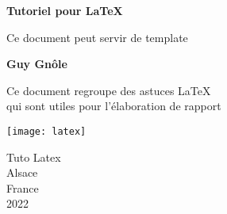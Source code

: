 \documentclass[../main.tex]{subfiles}
\begin{document}
\thispagestyle{empty}

\begin{center}
    \vspace*{2cm}
            
    \Huge
    \textbf{Tutoriel pour \LaTeX}
            
    \vspace{0.5cm}
    \Large
    Ce document peut servir de template
            
    \vspace{2cm}
            
    \textbf{Guy Gn\^{o}le}
            
    \vfill
            
    Ce document regroupe des astuces \LaTeX\\
    qui sont utiles pour l'élaboration de rapport
          
    \vspace{1cm}
            
    \texttt{[image: latex]}
    
    \vspace{0.5cm}
            
    \Large
    Tuto Latex\\
    Alsace\\
    France\\
    2022
        
\end{center}

\newpage
\end{document}
